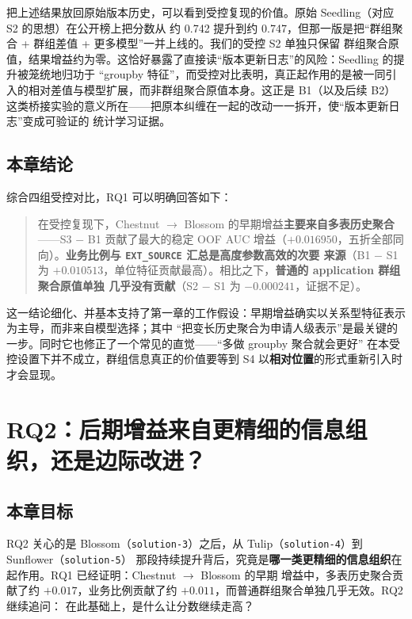 \documentclass[11pt,UTF8,fontset=windows]{ctexrep}
\begin{document}
把上述结果放回原始版本历史，可以看到受控复现的价值。原始 Seedling（对应 S2 的思想）在公开榜上把分数从
约 0.742 提升到约 0.747，但那一版是把“群组聚合 + 群组差值 + 更多模型”一并上线的。我们的受控 S2 单独只保留
群组聚合原值，结果增益约为零。这恰好暴露了直接读“版本更新日志”的风险：Seedling 的提升被笼统地归功于
“groupby 特征”，而受控对比表明，真正起作用的是被一同引入的相对差值与模型扩展，而非群组聚合原值本身。这正是
B1（以及后续 B2）这类桥接实验的意义所在——把原本纠缠在一起的改动一一拆开，使“版本更新日志”变成可验证的
统计学习证据。

\section{本章结论}

综合四组受控对比，RQ1 可以明确回答如下：

\begin{quote}
在受控复现下，Chestnut $\to$ Blossom 的早期增益\textbf{主要来自多表历史聚合}——S3 $-$ B1 贡献了最大的稳定
OOF AUC 增益（$+0.016950$，五折全部同向）。\textbf{业务比例与 \texttt{EXT\_SOURCE} 汇总是高度参数高效的次要
来源}（B1 $-$ S1 为 $+0.010513$，单位特征贡献最高）。相比之下，\textbf{普通的 application 群组聚合原值单独
几乎没有贡献}（S2 $-$ S1 为 $-0.000241$，证据不足）。
\end{quote}

这一结论细化、并基本支持了第一章的工作假设：早期增益确实以关系型特征表示为主导，而非来自模型选择；其中
“把变长历史聚合为申请人级表示”是最关键的一步。同时它也修正了一个常见的直觉——“多做 groupby 聚合就会更好”
在本受控设置下并不成立，群组信息真正的价值要等到 S4 以\textbf{相对位置}的形式重新引入时才会显现。

\chapter{RQ2：后期增益来自更精细的信息组织，还是边际改进？}
\label{chap:rq2}

\section{本章目标}

RQ2 关心的是 Blossom（\texttt{solution-3}）之后，从 Tulip（\texttt{solution-4}）到 Sunflower（\texttt{solution-5}）
那段持续提升背后，究竟是\textbf{哪一类更精细的信息组织}在起作用。RQ1 已经证明：Chestnut $\to$ Blossom 的早期
增益中，多表历史聚合贡献了约 $+0.017$，业务比例贡献了约 $+0.011$，而普通群组聚合单独几乎无效。RQ2 继续追问：
在此基础上，是什么让分数继续走高？
\end{document}
